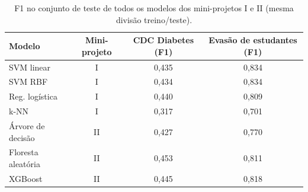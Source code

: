 \begin{table}[!t]
\centering
\caption{F1 no conjunto de teste de todos os modelos dos mini-projetos I e II (mesma divisão treino/teste).}
\label{tab:comparacao}
\begin{tabular}{lccc}
\hline
Modelo & Mini-projeto & CDC Diabetes (F1) & Evasão de estudantes (F1) \\
\hline
SVM linear & I & 0,435 & 0,834 \\
SVM RBF & I & 0,434 & 0,834 \\
Reg. logística & I & 0,440 & 0,809 \\
k-NN & I & 0,317 & 0,701 \\
Árvore de decisão & II & 0,427 & 0,770 \\
Floresta aleatória & II & 0,453 & 0,811 \\
XGBoost & II & 0,445 & 0,818 \\
\hline
\end{tabular}
\end{table}